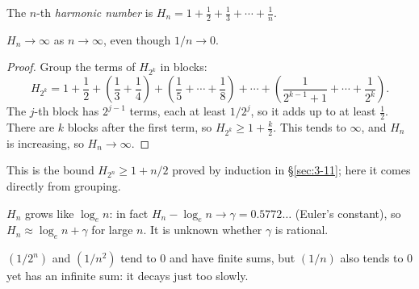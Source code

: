 \begin{definition}
The $n$-th \emph{harmonic number} is $H_n = 1+\frac12+\frac13+\cdots+\frac1n$.
\end{definition}

\begin{theorem}
$H_n\to\infty$ as $n\to\infty$, even though $1/n\to0$.
\end{theorem}
\begin{proof}
Group the terms of $H_{2^k}$ in blocks:
\[
H_{2^k} = 1 + \frac12 + \left(\frac13+\frac14\right) + \left(\frac15+\cdots+\frac18\right) + \cdots + \left(\frac{1}{2^{k-1}+1}+\cdots+\frac{1}{2^k}\right).
\]
The $j$-th block has $2^{j-1}$ terms, each at least $1/2^j$, so it adds up to at least $\frac12$. There are $k$ blocks after the first term, so $H_{2^k} \ge 1+\frac{k}{2}$. This tends to $\infty$, and $H_n$ is increasing, so $H_n\to\infty$.
\end{proof}

\begin{note}
This is the bound $H_{2^n}\ge1+n/2$ proved by induction in \S\ref{sec:3-11}; here it comes directly from grouping.
\end{note}

\begin{note}
$H_n$ grows like $\log_e n$: in fact $H_n - \log_e n \to \gamma = 0.5772\ldots$ (Euler's constant), so $H_n\approx\log_e n+\gamma$ for large $n$. It is unknown whether $\gamma$ is rational.
\end{note}

\begin{note}
$(1/2^n)$ and $(1/n^2)$ tend to $0$ and have finite sums, but $(1/n)$ also tends to $0$ yet has an infinite sum: it decays just too slowly.
\end{note}
